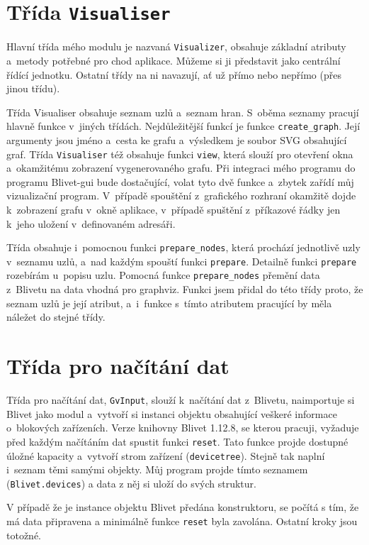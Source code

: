 \documentclass[color,table,oneside,nolot,nolof]{fithesis}
\begin{document}
\section{Třída \texttt{Visualiser}}
	Hlavní třída mého modulu je nazvaná \texttt{Visualizer}, obsahuje základní atributy a~metody potřebné pro chod aplikace. Můžeme si ji představit jako centrální řídící jednotku. Ostatní
	třídy na ni navazují, ať už přímo nebo nepřímo (přes jinou třídu). 

	Třída Visualiser obsahuje seznam uzlů a~seznam hran. S~oběma seznamy pracují hlavně funkce v~jiných třídách. Nejdůležitější funkcí
	je funkce \texttt{create\_graph}. Její argumenty jsou jméno a~cesta ke grafu a~výsledkem je soubor SVG obsahující graf. 
	Třída \texttt{Visualiser} též obsahuje funkci \texttt{view}, která slouží pro otevření okna a~okamžitému zobrazení vygenerovaného grafu. Při integraci mého programu do programu Blivet-gui bude dostačující,
	volat tyto dvě funkce a~zbytek zařídí můj vizualizační program.
	V~případě spouštění z~grafického rozhraní okamžitě dojde k~zobrazení grafu v~okně aplikace, v~případě spuštění z~příkazové řádky jen k~jeho uložení v~definovaném adresáři. 

	Třída obsahuje i~pomocnou funkci \texttt{prepare\_nodes}, která prochází jednotlivě uzly v~seznamu uzlů, a~nad každým spouští funkci \texttt{prepare}. Detailně funkci \texttt{prepare} rozebírám u~popisu uzlu.
	Pomocná funkce \texttt{prepare\_nodes}
	přemění data z~Blivetu na data vhodná pro graphviz. Funkci jsem přidal do této třídy proto, že seznam uzlů je její atribut, a~i~funkce s~tímto atributem pracující by měla náležet do stejné třídy.

\section{Třída pro načítání dat}
	Třída pro načítání dat, \texttt{GvInput}, slouží k~načítání dat z~Blivetu, naimportuje si Blivet jako modul a~vytvoří si instanci objektu obsahující veškeré informace
	o~blokových zařízeních. Verze knihovny Blivet 1.12.8, se kterou pracuji, vyžaduje před 
	každým načítáním dat spustit funkci \texttt{reset}. Tato funkce projde dostupné úložné kapacity a~vytvoří strom zařízení (\texttt{devicetree}). Stejně tak naplní i~seznam těmi
	samými objekty. Můj program projde tímto seznamem (\texttt{Blivet.devices}) a data z něj si uloží do svých struktur. 
	
	V případě že je instance objektu Blivet předána konstruktoru, se počítá s tím, že má data připravena a minimálně funkce \texttt{reset} byla zavolána.
	Ostatní kroky jsou totožné.
\end{document}
